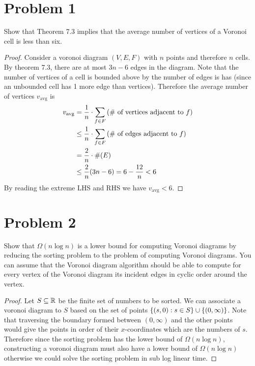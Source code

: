 \documentclass[12pt]{extarticle}
\begin{document}
\section*{Problem 1}
Show that Theorem 7.3 implies that the average number of vertices of a Voronoi cell is less than six.

\begin{proof}
    Consider a voronoi diagram $(V,E,F)$ with $n$ points and therefore $n$ cells. By theorem 7.3, there are at most $3n - 6$ edges in the diagram. Note that the number of vertices of a cell is bounded above by the number of edges is has (since an unbounded cell has 1 more edge than vertices). Therefore the average number of vertices $v_{\text{avg}}$ is
    \begin{align*}
        v_{\text{avg}} &= \frac{1}{n} \cdot \sum_{f \in F} \qty(\text{\# of vertices adjacent to $f$}) \\
                       &\leq \frac{1}{n} \cdot \sum_{f \in F} \qty(\text{\# of edges adjacent to $f$}) \\
                       &= \frac{2}{n} \cdot \#(E)  \\
                       &\leq \frac{2}{n} (3n-6) = 6-\frac{12}{n} < 6
    \end{align*}
    By reading the extreme LHS and RHS we have $v_\text{avg} < 6$.
\end{proof}

\section*{Problem 2}
Show that $\Omega(n\log n)$ is a lower bound for computing Voronoi diagrams by reducing the sorting problem to the problem of computing Voronoi diagrams. You can assume that the Voronoi diagram algorithm should be able to compute for every vertex of the Voronoi diagram its incident edges in cyclic order around the vertex. 

\begin{proof}
    Let $S \subseteq \mathbb{R}$ be the finite set of numbers to be sorted. We can associate a voronoi diagram to $S$ based on the set of points $\qty{(s, 0) : s \in S} \cup \qty{(0, \infty)}$. Note that traversing the boundary formed between $(0, \infty)$ and the other points would give the points in order of their $x$-coordinates which are the numbers of $s$. Therefore since the sorting problem has the lower bound of $\Omega(n \log n)$, constructing a voronoi diagram must also have a lower bound of $\Omega(n \log n)$ otherwise we could solve the sorting problem in sub log linear time.
\end{proof}
\end{document}
